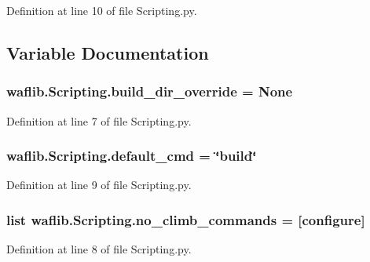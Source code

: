 Definition at line 10 of file Scripting.\+py.



\subsection{Variable Documentation}
\subsubsection[{\texorpdfstring{build\+\_\+dir\+\_\+override}{build_dir_override}}]{\setlength{\rightskip}{0pt plus 5cm}waflib.\+Scripting.\+build\+\_\+dir\+\_\+override = None}\hypertarget{namespacewaflib_1_1_scripting_a54b18d76a5fbf022197d1ac4db6c15af}{}\label{namespacewaflib_1_1_scripting_a54b18d76a5fbf022197d1ac4db6c15af}


Definition at line 7 of file Scripting.\+py.

\subsubsection[{\texorpdfstring{default\+\_\+cmd}{default_cmd}}]{ waflib.\+Scripting.\+default\+\_\+cmd = \char`\"{}build\char`\"{}}\hypertarget{namespacewaflib_1_1_scripting_a0c67e94f3c6497e497a9c0da29b421a6}{}\label{namespacewaflib_1_1_scripting_a0c67e94f3c6497e497a9c0da29b421a6}


Definition at line 9 of file Scripting.\+py.

\subsubsection[{\texorpdfstring{no\+\_\+climb\+\_\+commands}{no_climb_commands}}]{\setlength{\rightskip}{0pt plus 5cm}list waflib.\+Scripting.\+no\+\_\+climb\+\_\+commands = \mbox{[}\textquotesingle{}configure\textquotesingle{}\mbox{]}}\hypertarget{namespacewaflib_1_1_scripting_a37b95f6e8ee60112a5486f3260cc0155}{}\label{namespacewaflib_1_1_scripting_a37b95f6e8ee60112a5486f3260cc0155}


Definition at line 8 of file Scripting.\+py.

